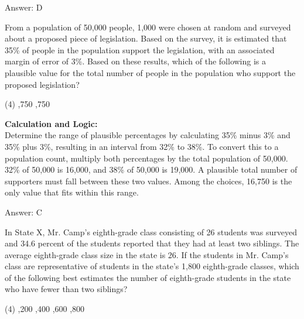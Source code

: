 \documentclass[11pt,paper=a4,answers]{exam}
\begin{document}
\begin{questions}
\begin{solution}
Answer: \colorbox{yellow!100}{D}
\end{solution}

\vspace{60pt}

\question
From a population of 50,000 people, 1,000 were chosen at random and surveyed about a proposed piece of legislation. Based on the survey, it is estimated that 35\% of people in the population support the legislation, with an associated margin of error of 3\%. Based on these results, which of the following is a plausible value for the total number of people in the population who support the proposed legislation?
\begin{tasks}(4)
    ,750
    ,750
\end{tasks}

\begin{solution}
\textbf{Calculation and Logic:} \\
Determine the range of plausible percentages by calculating 35\% minus 3\% and 35\% plus 3\%, resulting in an interval from 32\% to 38\%. To convert this to a population count, multiply both percentages by the total population of 50,000. 32\% of 50,000 is 16,000, and 38\% of 50,000 is 19,000. A plausible total number of supporters must fall between these two values. Among the choices, 16,750 is the only value that fits within this range.

\vspace{30pt}

Answer: \colorbox{yellow!100}{C}
\end{solution}

\vspace{60pt}

\question
In State X, Mr. Camp’s eighth-grade class consisting of 26 students was surveyed and 34.6 percent of the students reported that they had at least two siblings. The average eighth-grade class size in the state is 26. If the students in Mr. Camp’s class are representative of students in the state’s 1,800 eighth-grade classes, which of the following best estimates the number of eighth-grade students in the state who have fewer than two siblings?
\begin{tasks}(4)
    ,200
    ,400
    ,600
    ,800
\end{tasks}


\end{questions}
\end{document}
